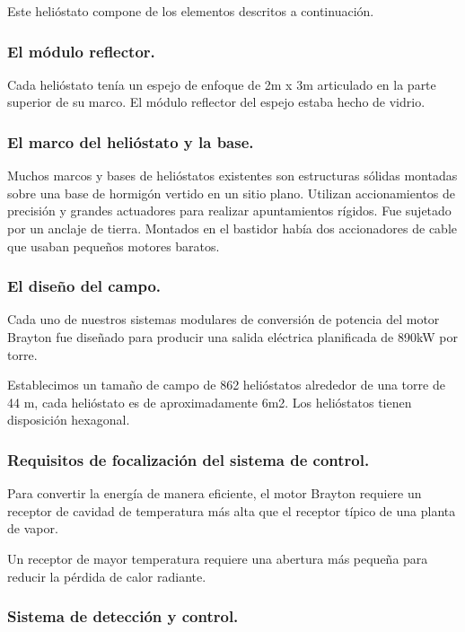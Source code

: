 Este helióstato compone de los elementos descritos a continuación.

\subsubsection{El módulo reflector.}

Cada helióstato tenía un espejo de enfoque de 2m x 3m articulado en la parte superior de su marco. El módulo reflector del espejo estaba hecho de vidrio.

\subsubsection{El marco del helióstato y la base.}

Muchos marcos y bases de helióstatos existentes son estructuras sólidas montadas sobre una base de hormigón vertido en un sitio plano. Utilizan accionamientos de precisión y grandes actuadores para realizar apuntamientos rígidos. Fue sujetado por un anclaje de tierra. Montados en el bastidor había dos accionadores de cable que usaban pequeños motores baratos.

\subsubsection{El diseño del campo.}

Cada uno de nuestros sistemas modulares de conversión de potencia del motor Brayton fue diseñado para producir una salida eléctrica planificada de 890kW por torre.

Establecimos un tamaño de campo de 862 helióstatos alrededor de una torre de 44 m, cada helióstato es de aproximadamente 6m2. Los helióstatos tienen disposición hexagonal.

\subsubsection{Requisitos de focalización del sistema de control.}

Para convertir la energía de manera eficiente, el motor Brayton requiere un receptor de cavidad de temperatura más alta que el receptor típico de una planta de vapor.

Un receptor de mayor temperatura requiere una abertura más pequeña para reducir la pérdida de calor radiante.

\subsubsection{Sistema de detección y control.}

